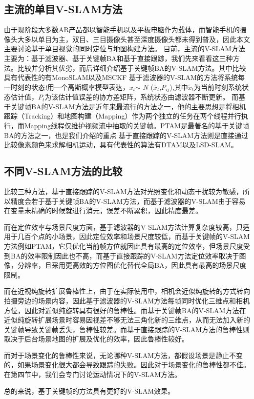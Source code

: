 \subsection{主流的单目V-SLAM方法}
由于现阶段大多数AR产品都以智能手机以及平板电脑作为载体，而智能手机的摄像头大多以单目为主，双目、三目摄像头甚至深度摄像头都未得到普及，因此本文主要讨论基于单目视觉的同时定位与地图构建方法。
目前，主流的V-SLAM方法主要为：基于滤波器、基于关键帧BA和基于直接跟踪，我们先来看看这三种方法。比较并分析其优劣，而后详细介绍基于关键帧BA的V-SLAM方法。其中比较具有代表性的有MonoSLAM以及MSCKF
基于滤波器的V-SLAM的方法将系统每一时刻的状态\textit{t}用一个高斯概率模型表达，$x_t$$\sim$ $\mathrm{\textit{N}}$ ($\tilde{x_{t}}$,$\mathrm{\textit{P}}_{ij}$),其中$\tilde{x}_t$为当前时刻系统状态估计值，$P_t$为该估计值误差的协方差矩阵，系统状态由滤波器不断更新。
而基于关键帧BA的V-SLAM方法\cite{TriggsB.HartleyR.I.FitzgibbonA.W.2000}是近年来最流行的方法之一，他的主要思想是将相机跟踪（Tracking）和地图构建（Mapping）作为两个独立的任务在两个线程并行执行，而Mapping线程仅维护视频流中抽取的关键帧。PTAM是最著名的基于关键帧BA的方法之一，也是我们介绍的重点
基于直接跟踪的V-SLAM方法则是直接通过比较像素颜色来求解相机运动，具有代表性的算法有DTAM以及LSD-SLAM。
\subsection{不同V-SLAM方法的比较}
比较三种方法，基于直接跟踪的V-SLAM方法对光照变化和动态干扰较为敏感，所以精度会若于基于关键帧BA的V-SLAM方法，而基于滤波器的V-SLAM由于容易在变量未精确的时候就进行消元，误差不断累积，因此精度最差。

而在定位效率与场景尺度方面，基于滤波器的V-SLAM方法计算复杂度较高，只适用于几百个点的小场景，因此定位效率和场景尺度较低，而基于关键帧的V-SLAM方法例如PTAM，它只优化当前帧方位就因此具有最高的定位效率，但场景尺度受到BA的效率限制因此也不高，而基于直接跟踪的V-SLAM方法定位效率取决于图像，分辨率，且采用更高效的方位图优化替代全局BA，因此具有最高的场景尺度限制。

而在近视纯旋转扩展鲁棒性上，由于在实际使用中，相机会近似纯旋转的方式转向拍摄旁边的场景内容，因此基于滤波器的V-SLAM方法每帧同时优化三维点和相机方位，因此对近似纯旋转具有很好的鲁棒性。而基于关键帧BA的V-SLAM方法在近似纯旋转扩展场景时容易因视差不够无法三角化新的三维点，从而无法加入新的关键帧导致关键帧丢失，鲁棒性较差。而基于直接跟踪的V-SLAM方法的鲁棒性则取决于后台场景地图的扩展及优化的效率，因此鲁棒性较好。

而对于场景变化的鲁棒性来说，无论哪种V-SLAM方法，都假设场景是静止不变的，如果场景变化很大都会导致跟踪的失败。因此对于场景变化的鲁棒性都不佳。在第四节中，我们会专门讨论运动情况下的V-SLAM方法。

总的来说，基于关键帧的方法具有更好的V-SLAM效果。

